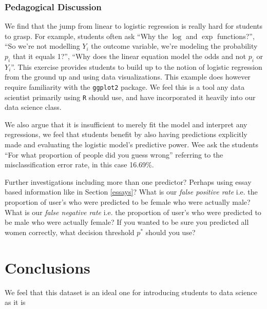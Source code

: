 \documentclass{article}\usepackage[]{graphicx}\usepackage[]{color}
\begin{document}
\subsubsection{Pedagogical Discussion}
We find that the jump from linear to logistic regression is really hard for students to grasp.  For example, students often ask ``Why the $\log$ and $\exp$ functions?'', ``So we're not modelling $Y_i$ the outcome variable, we're modeling the probability $p_i$ that it equals 1?'', ``Why does the linear equation model the odds and not $p_i$ or $Y_i$''.  This exercise provides students to build up to the notion of logistic regression from the ground up and using data visualizations.  This example does however require familiarity with the \verb#ggplot2# package.  We feel this is a tool any data scientist primarily using \verb#R# should use, and have incorporated it heavily into our data science class.

We also argue that it is insufficient to merely fit the model and interpret any regressions, we feel that students benefit by also having predictions explicitly made and evaluating the logistic model's predictive power.  Wee ask the students ``For what proportion of people did you guess wrong'' referring to the misclassification error rate, in this case 16.69\%.

Further investigations including more than one predictor?  Perhaps using essay based information like in Section \ref{essays}?  What is our \textit{false positive rate} i.e. the proportion of user's who were predicted to be female who were actually male?  What is our \textit{false negative rate} i.e. the proportion of user's who were predicted to be male who were actually female?  If you wanted to be sure you predicted all women correctly, what decision threshold $p^*$ should you use?












%
\section{Conclusions}
%
We feel that this dataset is an ideal one for introducing students to data science as it is
\end{document}
